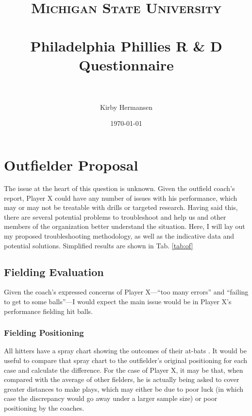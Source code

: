 \documentclass[paper=a4, fontsize=11pt]{scrartcl} %
\title{	
\normalfont \normalsize 
\textsc{Michigan State University} \\ [25pt] %
\horrule{0.5pt} \\[0.4cm] %
\huge Philadelphia Phillies R \& D Questionnaire \\ %
\horrule{2pt} \\[0.5cm] %
}
\author{Kirby Hermansen} %
\date{\normalsize\today} %
\begin{document}
\maketitle %



\section{Outfielder Proposal}

The issue at the heart of this question is unknown. Given the outfield coach's report, Player X could have any number of issues with his performance, which may or may not be treatable with drills or targeted research. Having said this, there are several potential problems to troubleshoot and help us and other members of the organization better understand the situation. Here, I will lay out my proposed troubleshooting methodology, as well as the indicative data and potential solutions. Simplified results are shown in Tab. \ref{tab:of}


\subsection{Fielding Evaluation} \label{sub:field}

Given the coach's expressed concerns of Player X---``too many errors'' and ``failing to get to some balls''---I would expect the main issue would be in Player X's performance fielding hit balls.

\subsubsection{Fielding Positioning} \label{subsub:fieldpos}

All hitters have a spray chart showing the outcomes of their at-bats \cite{baseballsavant}. It would be useful to compare that spray chart to the outfielder's original positioning for each case and calculate the difference. For the case of Player X, it may be that, when compared with the average of other fielders, he is actually being asked to cover greater distances to make plays, which may either be due to poor luck (in which case the discrepancy would go away under a larger sample size) or poor positioning by the coaches.  
\end{document}
